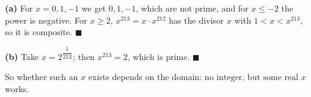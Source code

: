 \textbf{(a)} For $x=0,1,-1$ we get $0,1,-1$, which are not prime, and for $x\le-2$ the power is negative. For $x\ge2$, $x^{213}=x\cdot x^{212}$ has the divisor $x$ with $1<x<x^{213}$, so it is composite. $\blacksquare$

\textbf{(b)} Take $x=2^{\dfrac{1}{213}}$; then $x^{213}=2$, which is prime. $\blacksquare$

So whether such an $x$ exists depends on the domain: $\boxed{\text{no integer, but some real}}$ $x$ works.

